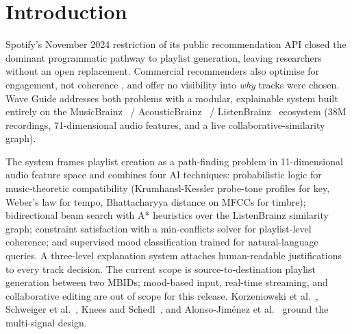 \section{Introduction}

Spotify's November 2024 restriction of its public recommendation API \cite{spotifyapi2024} closed the dominant programmatic pathway to playlist generation, leaving researchers without an open replacement. Commercial recommenders also optimise for engagement, not coherence \cite{schedl2018}, and offer no visibility into \emph{why} tracks were chosen. Wave Guide addresses both problems with a modular, explainable system built entirely on the MusicBrainz~\cite{musicbrainz2024} / AcousticBrainz~\cite{acousticbrainz2022} / ListenBrainz~\cite{listenbrainz2024} ecosystem (38M recordings, 71-dimensional audio features, and a live collaborative-similarity graph).

The system frames playlist creation as a path-finding problem in 11-dimensional audio feature space and combines four AI techniques: probabilistic logic for music-theoretic compatibility (Krumhansl-Kessler probe-tone profiles \cite{krumhansl1990} for key, Weber's law \cite{drake1993} for tempo, Bhattacharyya distance on MFCCs \cite{aucouturier2002,berenzweig2004} for timbre); bidirectional beam search with A* heuristics over the ListenBrainz similarity graph; constraint satisfaction with a min-conflicts solver for playlist-level coherence; and supervised mood classification trained for natural-language queries. A three-level explanation system attaches human-readable justifications to every track decision. The current scope is source-to-destination playlist generation between two MBIDs; mood-based input, real-time streaming, and collaborative editing are out of scope for this release. Korzeniowski et al.~\cite{korzeniowski2021}, Schweiger et al.~\cite{schweiger2025}, Knees and Schedl~\cite{knees2013}, and Alonso-Jim\'enez et al.~\cite{alonso2022} ground the multi-signal design.
